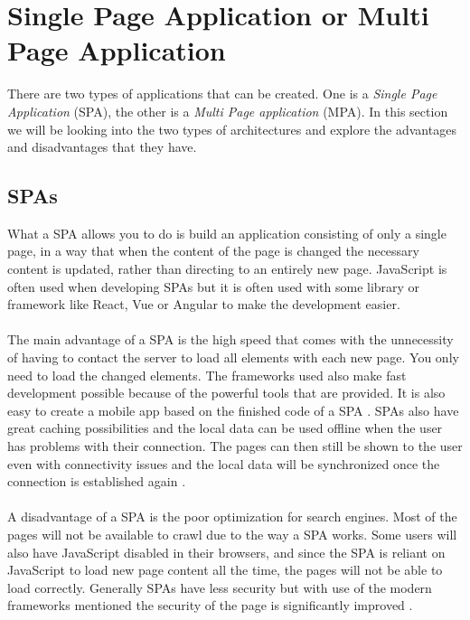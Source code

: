 \section{Single Page Application or Multi Page Application}
There are two types of applications that can be created.
One is a \textit{Single Page Application} (SPA), the other is a \textit{Multi Page application} (MPA).
In this section we will be looking into the two types of architectures and explore the advantages and disadvantages that they have.

\subsection{SPAs}
What a SPA allows you to do is build an application consisting of only a single page, in a way that when the content of the page is changed the necessary content is updated, rather than directing to an entirely new page.
JavaScript is often used when developing SPAs but it is often used with some library or framework like React, Vue or Angular to make the development easier.
\\\\
The main advantage of a SPA is the high speed that comes with the unnecessity of having to contact the server to load all elements with each new page.
You only need to load the changed elements.
The frameworks used also make fast development possible because of the powerful tools that are provided.
It is also easy to create a mobile app based on the finished code of a SPA \cite{SPAvsMPAMerehead}.
SPAs also have great caching possibilities and the local data can be used offline when the user has problems with their connection.
The pages can then still be shown to the user even with connectivity issues and the local data will be synchronized once the connection is established again \cite{SPAvsMPARuby}.
\\\\
A disadvantage of a SPA is the poor optimization for search engines.
Most of the pages will not be available to crawl due to the way a SPA works.
Some users will also have JavaScript disabled in their browsers, and since the SPA is reliant on JavaScript to load new page content all the time, the pages will not be able to load correctly.
Generally SPAs have less security but with use of the modern frameworks mentioned the security of the page is significantly improved \cite{SPAvsMPAMerehead}.

